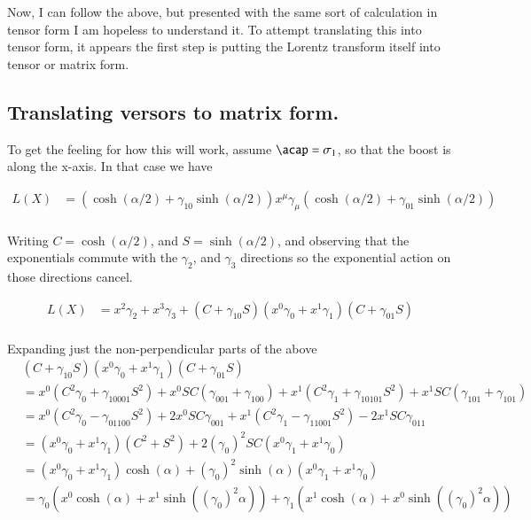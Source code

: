 Now, I can follow the above, but presented with the same sort of calculation in tensor form I am hopeless to understand it.  To attempt translating this
into tensor form, it appears the first step is putting the Lorentz transform itself into tensor or matrix form.

\subsection{Translating versors to matrix form. }

To get the feeling for how this will work, assume $\acap = \sigma_1$, so that the boost is along the x-axis.  In that case we have

\begin{align*}
L(X)
&= (\cosh( \alpha/2 ) + \gamma_{10} \sinh( \alpha/2 )) x^\mu \gamma_\mu (\cosh( \alpha/2 ) + \gamma_{01} \sinh( \alpha/2 )) \\
\end{align*}

Writing $C = \cosh(\alpha/2)$, and $S = \sinh(\alpha/2)$, and observing that the exponentials commute with the $\gamma_2$, and $\gamma_3$ directions so the exponential
action on those directions cancel.

\begin{align*}
L(X)
&= x^2 \gamma_2 + x^3 \gamma_3 + (C + \gamma_{10} S) ( x^0 \gamma_0 + x^1 \gamma_1 ) (C + \gamma_{01} S) \\
\end{align*}

Expanding just the non-perpendicular parts of the above
\begin{align*}
&(C + \gamma_{10} S) ( x^0 \gamma_0 + x^1 \gamma_1 ) (C + \gamma_{01} S) \\
&=
x^0 (C^2 \gamma_0 + \gamma_{10001} S^2) + x^0 S C (\gamma_{001} + \gamma_{100})
+x^1 (C^2 \gamma_1 + \gamma_{10101} S^2) + x^1 S C (\gamma_{101} + \gamma_{101}) \\
&=
x^0 (C^2 \gamma_0 - \gamma_{01100} S^2) + 2 x^0 S C \gamma_{001} 
+x^1 (C^2 \gamma_1 - \gamma_{11001} S^2) - 2 x^1 S C \gamma_{011} \\
&= (x^0 \gamma_0 + x^1 \gamma_1) (C^2 + S^2) + 2 (\gamma_0)^2 S C (x^0 \gamma_{1} + x^1 \gamma_{0}) \\
&= (x^0 \gamma_0 + x^1 \gamma_1) \cosh(\alpha) + (\gamma_0)^2 \sinh(\alpha) (x^0 \gamma_{1} + x^1 \gamma_{0}) \\
&= 
\gamma_0 ( x^0 \cosh(\alpha) + x^1 \sinh((\gamma_0)^2 \alpha) )
+\gamma_1 ( x^1 \cosh(\alpha) + x^0 \sinh((\gamma_0)^2 \alpha) ) \\
\end{align*}


